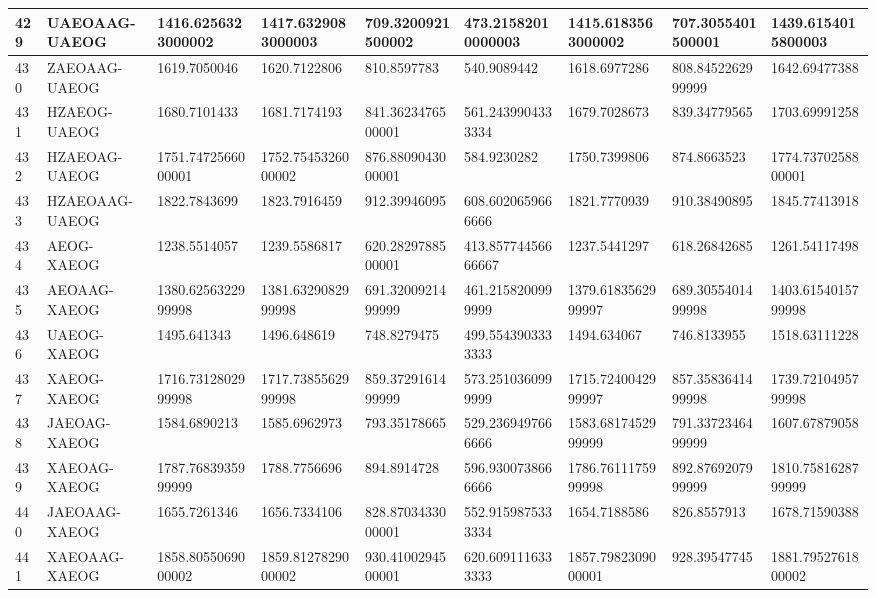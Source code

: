 {\begin{longtable}{|l|l|l|l|l|l|l|l|l|}
        429 & UAEOAAG-UAEOG & 1416.6256323000002 & 1417.6329083000003 & 709.3200921500002 & 473.21582010000003 & 1415.6183563000002 & 707.3055401500001 & 1439.6154015800003 \\ \hline
        430 & ZAEOAAG-UAEOG & 1619.7050046 & 1620.7122806 & 810.8597783 & 540.9089442 & 1618.6977286 & 808.8452262999999 & 1642.69477388 \\ \hline
        431 & HZAEOG-UAEOG & 1680.7101433 & 1681.7174193 & 841.3623476500001 & 561.2439904333334 & 1679.7028673 & 839.34779565 & 1703.69991258 \\ \hline
        432 & HZAEOAG-UAEOG & 1751.7472566000001 & 1752.7545326000002 & 876.8809043000001 & 584.9230282 & 1750.7399806 & 874.8663523 & 1774.7370258800001 \\ \hline
        433 & HZAEOAAG-UAEOG & 1822.7843699 & 1823.7916459 & 912.39946095 & 608.6020659666666 & 1821.7770939 & 910.38490895 & 1845.77413918 \\ \hline
        434 & AEOG-XAEOG & 1238.5514057 & 1239.5586817 & 620.2829788500001 & 413.85774456666667 & 1237.5441297 & 618.26842685 & 1261.54117498 \\ \hline
        435 & AEOAAG-XAEOG & 1380.6256322999998 & 1381.6329082999998 & 691.3200921499999 & 461.2158200999999 & 1379.6183562999997 & 689.3055401499998 & 1403.6154015799998 \\ \hline
        436 & UAEOG-XAEOG & 1495.641343 & 1496.648619 & 748.8279475 & 499.5543903333333 & 1494.634067 & 746.8133955 & 1518.63111228 \\ \hline
        437 & XAEOG-XAEOG & 1716.7312802999998 & 1717.7385562999998 & 859.3729161499999 & 573.2510360999999 & 1715.7240042999997 & 857.3583641499998 & 1739.7210495799998 \\ \hline
        438 & JAEOAG-XAEOG & 1584.6890213 & 1585.6962973 & 793.35178665 & 529.2369497666666 & 1583.6817452999999 & 791.3372346499999 & 1607.67879058 \\ \hline
        439 & XAEOAG-XAEOG & 1787.7683935999999 & 1788.7756696 & 894.8914728 & 596.9300738666666 & 1786.7611175999998 & 892.8769207999999 & 1810.7581628799999 \\ \hline
        440 & JAEOAAG-XAEOG & 1655.7261346 & 1656.7334106 & 828.8703433000001 & 552.9159875333334 & 1654.7188586 & 826.8557913 & 1678.71590388 \\ \hline
        441 & XAEOAAG-XAEOG & 1858.8055069000002 & 1859.8127829000002 & 930.4100294500001 & 620.6091116333333 & 1857.7982309000001 & 928.39547745 & 1881.7952761800002 \\ \hline

\end{longtable}}
